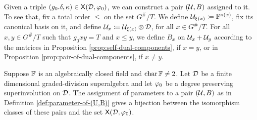Given a triple $(g_0. \delta, \kappa) \in \mathsf{X} (\mathcal{D}, \varphi_0)$, we can construct a pair $(\mathcal U, B)$ assigned to it. 
To see that, fix a total order $\leq$ on the set $G^\#/T$.
We define $\mathcal U_{\xi(x)} \coloneqq \mathbb{F}^{\kappa(x)}$, fix its canonical basis on it, and define $\mathcal U_x \coloneqq \mathcal U_{\xi(x)} \otimes \mathcal{D}$, for all $x\in G^\#/T$. 
For all $x, y \in G^\#/T$ such that $g_0x y = T$ and $x \leq y$, we define $B_x$ on $\mathcal U_x + \mathcal U_y$ according to the matrices in Proposition \ref{prop:self-dual-components}, if $x=y$, or in Proposition \ref{prop:pair-of-dual-components}, if $x\neq y$. 


\begin{thm}
    Suppose $\mathbb{F}$ is an algebraically closed field and $\operatorname{char} \mathbb{F} \neq 2$. 
    Let $\mathcal{D}$ be a finite dimensional graded-division superalgebra and let $\varphi_0$ be a degree preserving superinvolution on $\mathcal{D}$. 
    The assignment of parameters to a pair $(\mathcal U, B)$ as in Definition \ref{def:parameter-of-(U,B)} gives a bijection between the isomorphism classes of these pairs and the set $\mathsf{X} (\mathcal{D}, \varphi_0)$.
\end{thm}

